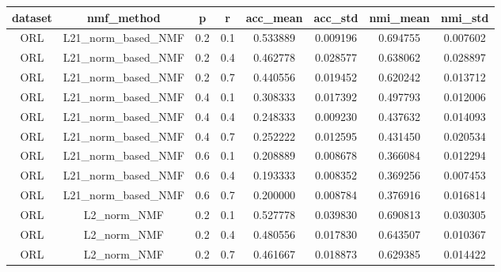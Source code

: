 \begin{table}[p]
\centering
\begin{tabular}{cccccccc}
\hline
\textbf{dataset} & \textbf{nmf\_method}  & \textbf{p} & \textbf{r} & \textbf{acc\_mean} & \textbf{acc\_std} & \textbf{nmi\_mean} & \textbf{nmi\_std} \\
\hline
ORL              & L21\_norm\_based\_NMF & 0.2        & 0.1        & 0.533889           & 0.009196          & 0.694755           & 0.007602          \\
ORL              & L21\_norm\_based\_NMF & 0.2        & 0.4        & 0.462778           & 0.028577          & 0.638062           & 0.028897          \\
ORL              & L21\_norm\_based\_NMF & 0.2        & 0.7        & 0.440556           & 0.019452          & 0.620242           & 0.013712          \\
ORL              & L21\_norm\_based\_NMF & 0.4        & 0.1        & 0.308333           & 0.017392          & 0.497793           & 0.012006          \\
ORL              & L21\_norm\_based\_NMF & 0.4        & 0.4        & 0.248333           & 0.009230          & 0.437632           & 0.014093          \\
ORL              & L21\_norm\_based\_NMF & 0.4        & 0.7        & 0.252222           & 0.012595          & 0.431450           & 0.020534          \\
ORL              & L21\_norm\_based\_NMF & 0.6        & 0.1        & 0.208889           & 0.008678          & 0.366084           & 0.012294          \\
ORL              & L21\_norm\_based\_NMF & 0.6        & 0.4        & 0.193333           & 0.008352          & 0.369256           & 0.007453          \\
ORL              & L21\_norm\_based\_NMF & 0.6        & 0.7        & 0.200000           & 0.008784          & 0.376916           & 0.016814          \\
ORL              & L2\_norm\_NMF         & 0.2        & 0.1        & 0.527778           & 0.039830          & 0.690813           & 0.030305          \\
ORL              & L2\_norm\_NMF         & 0.2        & 0.4        & 0.480556           & 0.017830          & 0.643507           & 0.010367          \\
ORL              & L2\_norm\_NMF         & 0.2        & 0.7        & 0.461667           & 0.018873          & 0.629385           & 0.014422          \\

\end{tabular}
\end{table}
